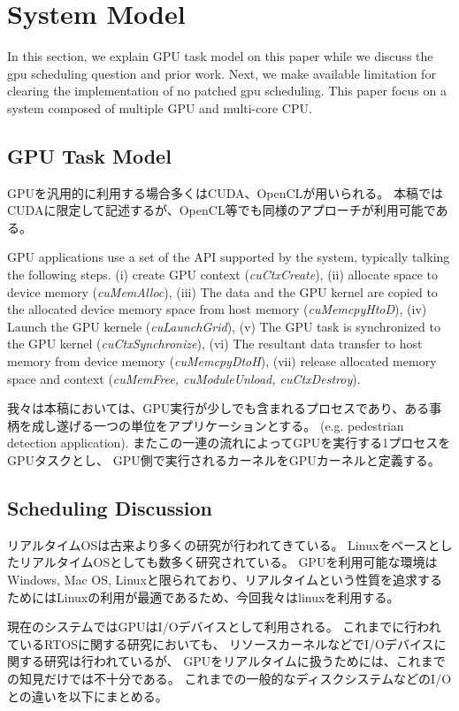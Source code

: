 \section{System Model}
In this section, we explain GPU task model on this paper while we discuss the gpu scheduling question and prior work.
Next, we make available limitation for clearing the implementation of no patched gpu scheduling.
This paper focus on a system composed of multiple GPU and multi-core CPU.

\subsection{GPU Task Model}
GPUを汎用的に利用する場合多くはCUDA、OpenCLが用いられる。
本稿ではCUDAに限定して記述するが、OpenCL等でも同様のアプローチが利用可能である。

GPU applications use a set of the API supported by the system,
typically talking the following steps.
(i) create GPU context (\textit{cuCtxCreate}), 
(ii) allocate space to device memory (\textit{cuMemAlloc}), 
(iii) The data and the GPU kernel are copied to the allocated device memory space from host memory (\textit{cuMemcpyHtoD}), 
(iv) Launch the GPU kernele (\textit{cuLaunchGrid}), 
(v) The GPU task is synchronized to the GPU kernel (\textit{cuCtxSynchronize}), 
(vi) The resultant data transfer to host memory from device memory (\textit{cuMemcpyDtoH}), 
(vii) release allocated memory space and context (\textit{cuMemFree, cuModuleUnload, cuCtxDestroy}).

我々は本稿においては、GPU実行が少しでも含まれるプロセスであり、ある事柄を成し遂げる一つの単位をアプリケーションとする。 (e.g. pedestrian detection application).
またこの一連の流れによってGPUを実行する1プロセスをGPUタスクとし、
GPU側で実行されるカーネルをGPUカーネルと定義する。

\subsection{Scheduling Discussion}
リアルタイムOSは古来より多くの研究\cite{spring,redline,itron,rk}が行われてきている。
LinuxをベースとしたリアルタイムOSとしても数多く研究\cite{prk,rtai,yodaiken1999rtlinux,litmus,kato:loadable}されている。
GPUを利用可能な環境はWindows, Mac OS, Linuxと限られており、リアルタイムという性質を追求するためにはLinuxの利用が最適であるため、今回我々はlinuxを利用する。

現在のシステムではGPUはI/Oデバイスとして利用される。
これまでに行われているRTOSに関する研究においても、
リソースカーネルなどでI/Oデバイスに関する研究は行われているが、
GPUをリアルタイムに扱うためには、これまでの知見だけでは不十分である。
これまでの一般的なディスクシステムなどのI/Oとの違いを以下にまとめる。

